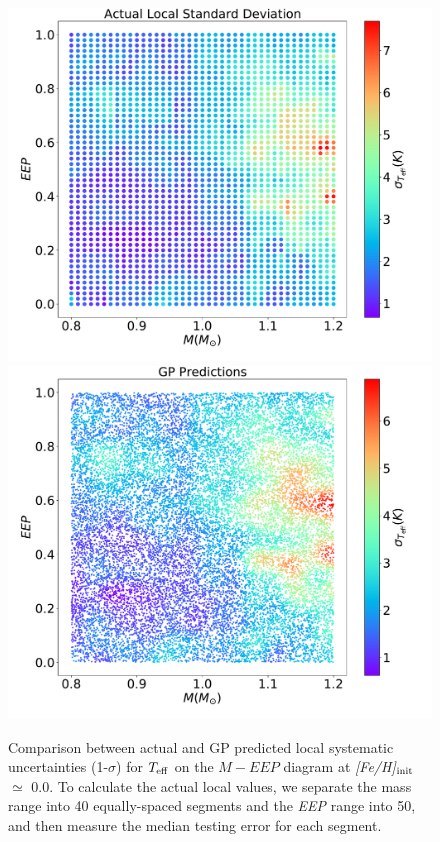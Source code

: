 \begin{figure}
	\includegraphics[width=1.0\columnwidth]{5d_sys_teff.pdf}
	\includegraphics[width=1.0\columnwidth]{5d_sys_effective_T_std_predictions.pdf}
    \caption{Comparison between actual and GP predicted local systematic uncertainties (1-$\sigma$) for $T_{\rm eff}$ on the $M - EEP$ diagram at {\it [Fe/H]}$_{\rm init}$ $\simeq$ 0.0. To calculate the actual local values, we separate the mass range into 40 equally-spaced segments and the {\it EEP} range into 50, and then measure the median testing error for each segment. } 
  \label{fig:5d_sys_teff}
\end{figure}

